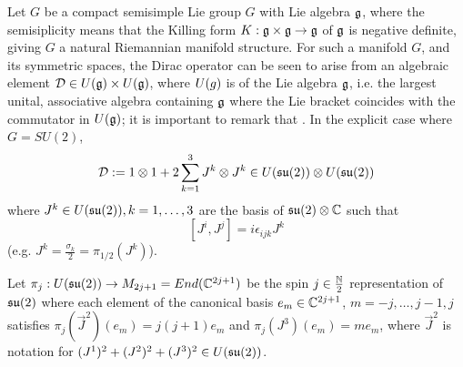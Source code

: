 Let $G$ be a compact semisimple Lie group $G$ with Lie algebra $\mathfrak{g}$, where the semisiplicity means that the Killing form $K: \mathfrak{g} \times \mathfrak{g} \to \mathfrak{g}$ of $\mathfrak{g}$ is negative definite, giving $G$ a natural Riemannian manifold structure. For such a manifold $G$, and its symmetric spaces, the Dirac operator can be seen to arise \cite{Huang2007} from an algebraic element $\textcolor{black}{\mathcal D } \in U(\mathfrak{g})\times U(\mathfrak{g})$, where $\textcolor{black}{U}(g)$ is  of the Lie algebra $\mathfrak{g}$, i.e. the largest unital, associative algebra containing $\mathfrak{g}$ where the Lie bracket coincides with the commutator in $U(\mathfrak{g})$; it is important to remark that . In the explicit case where $G = SU(2)$,
\begin{equation}\label{equationALgebraicDiracOperatorDecomposition}
    \textcolor{black}{\mathcal D} := 1 \otimes 1 + 2 \sum_{k = 1}^3 J^k \otimes J^k \in U(\mathfrak{su}(2)) \otimes U(\mathfrak{su}(2))
\end{equation}
where $J^k \in U(\mathfrak{su}(2)), k = 1, \dots, 3$ are the basis of $\mathfrak{su}(2)\otimes \mathbb{C}$ such that 
\begin{equation}\label{equationCommutationRelationJs}
    [J^i, J^j] = i \epsilon_{ijk} J^k
\end{equation} (e.g. $J^k = \frac{\sigma_k}{2} = \pi_{1/2}(J^k)$). 

\lin

Let $\textcolor{black}{\pi_j}: U(\mathfrak{su}(2)) \to M_{2j+1} = End(\mathbb{C}^{2j+1})$ be the spin $j \in \frac{\mathbb{N}}{2}$ representation of $\mathfrak{su}(2)$ where each element of the canonical basis $e_m \in \mathbb{C}^{2j+1}$, $m = -j, \dots, j-1, j$ satisfies $\pi_j(\vec J^2)(e_m) = j(j+1) e_m$ and $\pi_j(J^3)(e_m) = m e_m$, where $\vec J^2$ is notation for $(J^1)^2 + (J^2)^2 + (J^3)^2 \in U(\mathfrak{su}(2))$.

